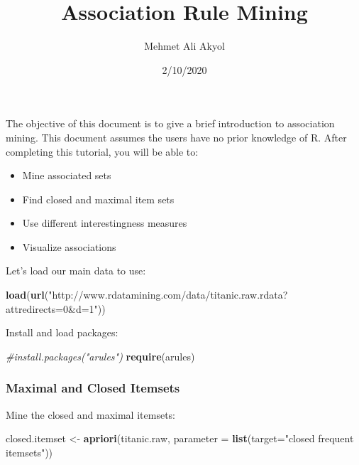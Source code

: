 \documentclass[]{article}
\title{Association Rule Mining}
\author{Mehmet Ali Akyol}
\date{2/10/2020}
\newenvironment{Shaded}{\begin{snugshade}}{\end{snugshade}}
\newcommand{\CommentTok}[1]{\textcolor[rgb]{0.56,0.35,0.01}{\textit{#1}}}
\newcommand{\DataTypeTok}[1]{\textcolor[rgb]{0.13,0.29,0.53}{#1}}
\newcommand{\KeywordTok}[1]{\textcolor[rgb]{0.13,0.29,0.53}{\textbf{#1}}}
\newcommand{\NormalTok}[1]{#1}
\newcommand{\StringTok}[1]{\textcolor[rgb]{0.31,0.60,0.02}{#1}}
\providecommand{\tightlist}{%
  \setlength{\itemsep}{0pt}\setlength{\parskip}{0pt}}
\begin{document}
\maketitle

The objective of this document is to give a brief introduction to
association mining. This document assumes the users have no prior
knowledge of R. After completing this tutorial, you will be able to:

\begin{itemize}
\tightlist
\item
  Mine associated sets
\item
  Find closed and maximal item sets
\item
  Use different interestingness measures
\item
  Visualize associations
\end{itemize}

Let's load our main data to use:

\begin{Shaded}
\begin{Highlighting}[]
\KeywordTok{load}\NormalTok{(}\KeywordTok{url}\NormalTok{(}\StringTok{"http://www.rdatamining.com/data/titanic.raw.rdata?attredirects=0&d=1"}\NormalTok{))}
\end{Highlighting}
\end{Shaded}

Install and load packages:

\begin{Shaded}
\begin{Highlighting}[]
\CommentTok{#install.packages("arules")}
\KeywordTok{require}\NormalTok{(arules)}
\end{Highlighting}
\end{Shaded}

\hypertarget{maximal-and-closed-itemsets}{%
\subsubsection{Maximal and Closed
Itemsets}\label{maximal-and-closed-itemsets}}

Mine the closed and maximal itemsets:

\begin{Shaded}
\begin{Highlighting}[]
\NormalTok{closed.itemset <-}\StringTok{ }\KeywordTok{apriori}\NormalTok{(titanic.raw, }\DataTypeTok{parameter =} \KeywordTok{list}\NormalTok{(}\DataTypeTok{target=}\StringTok{"closed frequent itemsets"}\NormalTok{))}
\end{Highlighting}
\end{Shaded}
\end{document}
